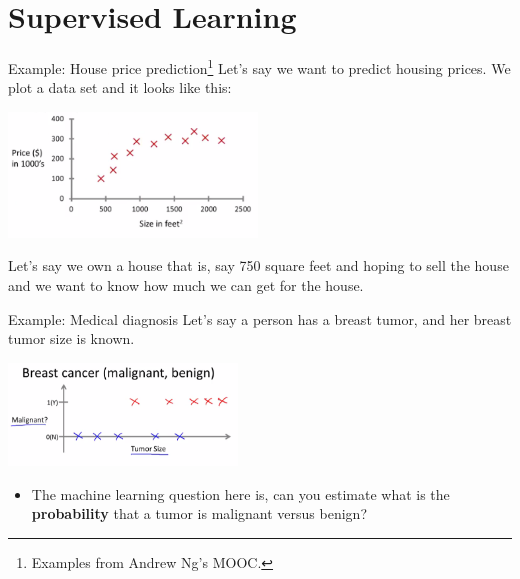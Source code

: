 \documentclass[
  9pt,
  ignorenonframetext,
  aspectratio=169,
  t, dvipsnames]{beamer}
\theoremstyle{definition}
\begin{document}
\hypertarget{supervised-learning}{%
\section{Supervised Learning}\label{supervised-learning}}

\begin{frame}{Example: House price
prediction\footnote{Examples from Andrew Ng's MOOC.}}
\protect\hypertarget{example-house-price-prediction}{}
Let's say we want to predict housing prices. We plot a data set and it
looks like this:

\begin{center}
\includegraphics[width=250px]{img/sl1} 
\end{center}

Let's say we own a house that is, say 750 square feet and hoping to sell
the house and we want to know how much we can get for the house.
\end{frame}

\begin{frame}{Example: Medical diagnosis}
\protect\hypertarget{example-medical-diagnosis}{}
Let's say a person has a breast tumor, and her breast tumor size is
known.

\begin{center}
\includegraphics[width=230px]{img/sl5} 
\end{center}
\begin{itemize}
  \item The machine learning question here is, can you estimate what is the \textbf{probability} that a tumor is malignant versus benign?
\end{itemize}
\end{frame}
\end{document}

